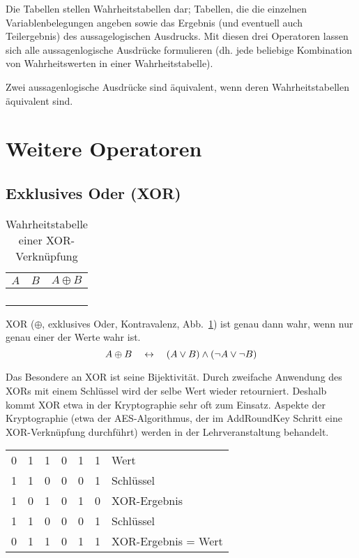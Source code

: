 Die Tabellen stellen Wahrheitstabellen dar; Tabellen, die die einzelnen Variablenbelegungen angeben sowie das Ergebnis (und eventuell auch Teilergebnis) des aussagelogischen Ausdrucks. Mit diesen drei Operatoren lassen sich alle aussagenlogische Ausdrücke formulieren (dh. jede beliebige Kombination von Wahrheitswerten in einer Wahrheitstabelle).

Zwei aussagenlogische Ausdrücke sind äquivalent, wenn deren Wahrheitstabellen äquivalent sind.
%
\section{Weitere Operatoren}
%
\subsection{Exklusives Oder (XOR)}
%
\begin{table}[ht]
 \begin{center}
  \begin{tabular}{cc|c}
   \hline
    $A$ & $B$ & $A \oplus{} B$ \\
   \hline \hline
    \F  & \F  & \F \\
    \F  & \T  & \T \\
    \T  & \F  & \T \\
    \T  & \T  & \F \\
  \end{tabular}
  \caption{Wahrheitstabelle einer XOR-Verknüpfung}
  \label{fig:xor_operator}
 \end{center}
\end{table}
%
XOR ($\oplus$, exklusives Oder, Kontravalenz, Abb.~\ref{fig:xor_operator}) ist genau dann wahr, wenn nur genau einer der Werte wahr ist.
\[
  A \oplus B \quad\leftrightarrow\quad (A \lor B) \land (\neg A \lor \neg B)
\]

Das Besondere an XOR ist seine Bijektivität. Durch zweifache Anwendung des XORs mit einem Schlüssel wird der selbe Wert wieder retourniert. Deshalb kommt XOR etwa in der Kryptographie sehr oft zum Einsatz. Aspekte der Kryptographie (etwa der AES-Algorithmus, der im AddRoundKey Schritt eine XOR-Verknüpfung durchführt) werden in der Lehrveranstaltung \courseiis{} behandelt.
%
\begin{table}[ht]
  \begin{center}
    \begin{tabular}{cccccc|l}
      0&1&1&0&1&1& Wert \\
      1&1&0&0&0&1& Schlüssel \\
    \hline
      1&0&1&0&1&0& XOR-Ergebnis \\
      1&1&0&0&0&1& Schlüssel \\
    \hline
      0&1&1&0&1&1& XOR-Ergebnis = Wert
    \end{tabular}
  \end{center}
\end{table}

